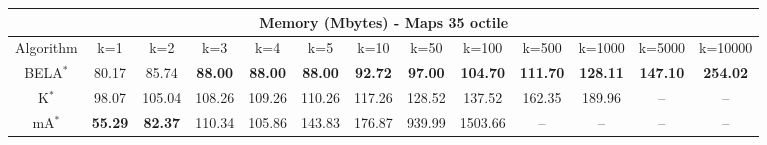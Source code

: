 \begin{tabular}{c|cccccccccccc}\toprule
\multicolumn{13}{c}{Memory (Mbytes) - Maps 35 octile}\\ \midrule
Algorithm & k=1 & k=2 & k=3 & k=4 & k=5 & k=10 & k=50 & k=100 & k=500 & k=1000 & k=5000 & k=10000 \\ \midrule
BELA$^*$ & 80.17 & 85.74 & \textbf{88.00} & \textbf{88.00} & \textbf{88.00} & \textbf{92.72} & \textbf{97.00} & \textbf{104.70} & \textbf{111.70} & \textbf{128.11} & \textbf{147.10} & \textbf{254.02} \\
K$^*$ & 98.07 & 105.04 & 108.26 & 109.26 & 110.26 & 117.26 & 128.52 & 137.52 & 162.35 & 189.96 & -- & -- \\
mA$^*$ & \textbf{55.29} & \textbf{82.37} & 110.34 & 105.86 & 143.83 & 176.87 & 939.99 & 1503.66 & -- & -- & -- & -- \\ \bottomrule 
\end{tabular}
